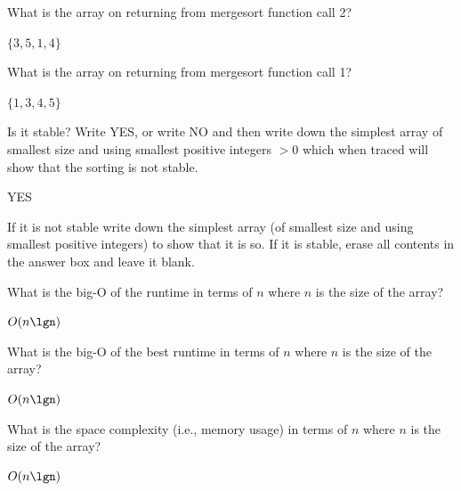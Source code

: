 \nextq
What is the array on returning from mergesort function call 2?
\\
\ANSWER
\begin{answerlong}
$\{ 3, 5, 1, 4 \}$
\end{answerlong}

\nextq
What is the array on returning from mergesort function call 1?
\\
\ANSWER
\begin{answerlong}
$\{ 1, 3, 4, 5 \}$
\end{answerlong}

\nextq
Is it stable?
Write YES, or write NO and then write down the simplest array
of smallest size and using smallest positive integers $> 0$
which when traced will show that the sorting is not stable.
\\
\ANSWER
\begin{answerlong}
YES
\end{answerlong}

\nextq
If it is not stable write down the simplest array
(of smallest size and using smallest positive integers)
to show that it is so.
If it is stable, erase all contents in the answer box and leave it blank.
\\
\ANSWER
\begin{answerlong}
\end{answerlong}

\nextq
What is the big-O of the runtime
in terms of $n$ where $n$ is the size of the array?
\\
\ANSWER
\begin{answerlong}
$O(n\lgn)$
\end{answerlong}

\nextq
What is the big-O of the best runtime
in terms of $n$ where $n$ is the size of the array?
\\
\ANSWER
\begin{answerlong}
$O(n\lgn)$
\end{answerlong}

\nextq
What is the space complexity (i.e., memory usage)
in terms of $n$ where $n$ is the size of the array?
\\
\ANSWER
\begin{answerlong}
$O(n\lgn)$
\end{answerlong}


